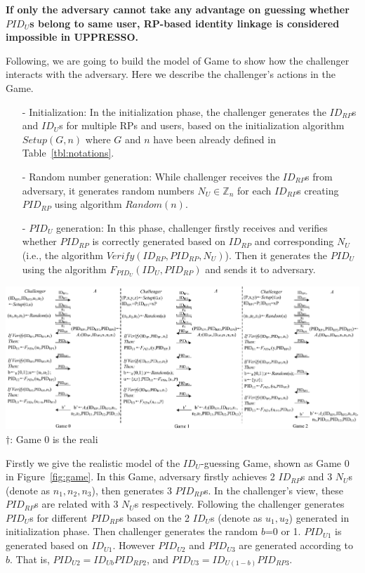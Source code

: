 \textbf{If only the adversary cannot take any advantage on guessing whether $PID_U$s belong to same user, RP-based identity linkage is considered impossible in UPPRESSO.}


Following, we are going to build the model of Game to show how the challenger interacts with the adversary. Here we describe the challenger's actions in the Game.
\begin{itemize}
\vspace{-\topsep}
\item[-] Initialization: In the initialization phase, the challenger generates the $ID_{RP}$s and $ID_U$s for multiple RPs and users, based on the initialization algorithm $Setup(G,n)$ where $G$ and $n$ have been already defined in Table~\ref{tbl:notations}.
\vspace{-\topsep}
\item[-] Random number generation: While challenger receives the $ID_{RP}$s from adversary, it generates random numbers $N_U \in \mathbb{Z}_n$ for each $ID_{RP}$s creating $PID_{RP}$ using algorithm $Random(n)$.
\vspace{-\topsep}
\item[-] $PID_U$ generation: In this phase, challenger firstly receives and  verifies whether $PID_{RP}$ is correctly generated based on $ID_{RP}$ and corresponding $N_U$ (i.e., the algorithm $Verify(ID_{RP},PID_{RP},N_U)$). Then it generates the $PID_U$ using the algorithm $F_{PID_U}(ID_U,PID_{RP})$ and sends it to adversary.
\end{itemize}
\vspace{-\topsep}
\begin{strip}
\centering\includegraphics[width=\textwidth, height=0.3\textheight]{fig/game.pdf}
\flushleft
{\footnotesize
$\dag$: Game 0 is the reali}
\label{fig:game}
\vspace{-5mm}
\end{strip}
Firstly we give the realistic model of the $ID_U$-guessing Game, shown as Game 0 in Figure~\ref{fig:game}. In this Game, adversary firstly achieves 2 $ID_{RP}$s and 3 $N_U$s (denote as $n_1, n_2, n_3$), then generates 3 $PID_{RP}$s. In the challenger's view, these $PID_{RP}$s are related with 3 $N_U$s respectively. Following the challenger generates $PID_U$s for different $PID_{RP}$s based on the 2 $ID_U$s (denote as $u_1, u_2$) generated in initialization phase. 
Then challenger generates the random $b$=0 or 1. $PID_{U1}$ is generated based on $ID_{U1}$. However $PID_{U2}$ and $PID_{U3}$ are generated according to $b$. That is, $PID_{U2}=ID_{Ub}PID_{RP2}$, and $PID_{U3}=ID_{U(1-b)}PID_{RP3}$.  



